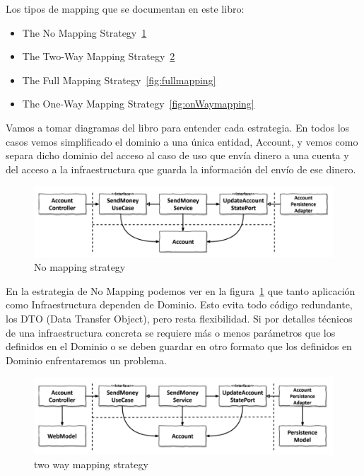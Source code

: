 Los tipos de mapping que se documentan en este libro\cite{TomHombergs2019GYHD}:
\begin{itemize}
    \item The No Mapping Strategy~\cref{fig:nomapping}
    \item The Two-Way Mapping Strategy~\cref{fig:twowaymapping}
    \item The Full Mapping Strategy~\cref{fig:fullmapping}
    \item The One-Way Mapping Strategy~\cref{fig:onWaymapping}
\end{itemize}

Vamos a tomar diagramas del libro para entender cada estrategia. En todos los casos vemos simplificado el dominio a una única entidad, Account, y vemos como separa dicho dominio del acceso al caso de uso que envía dinero a una cuenta y del acceso a la infraestructura que guarda la información del envío de ese dinero.

\begin{figure}[H]
    \centering
    \includegraphics[height=0.1\textheight]{./part/Ejecucion/Seguimiento/CreateTaskUseCase/img/nomapping}
    \caption{No mapping strategy~\cite{TomHombergs2019GYHD}}\label{fig:nomapping}
\end{figure}

En la estrategia de No Mapping podemos ver en la figura~\cref{fig:nomapping} que tanto aplicación como Infraestructura dependen de Dominio. Esto evita todo código redundante, los \gls{DTO} (Data Transfer Object), pero resta flexibilidad. Si por detalles técnicos de una infraestructura concreta se requiere más o menos parámetros que los definidos en el Dominio o se deben guardar en otro formato que los definidos en Dominio enfrentaremos un problema.

\begin{figure}[H]
    \centering
    \includegraphics[height=0.1\textheight]{./part/Ejecucion/Seguimiento/CreateTaskUseCase/img/twowaymapping}
    \caption{two way mapping strategy~\cite{TomHombergs2019GYHD}}\label{fig:twowaymapping}
\end{figure}

